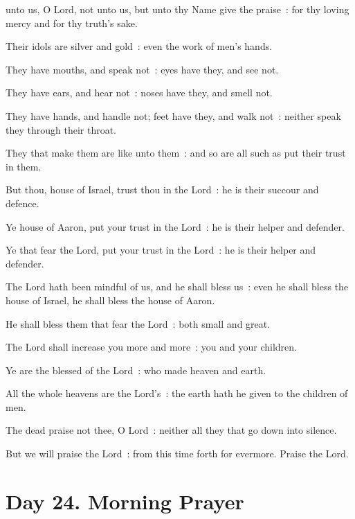  unto us, O Lord, not unto us, but unto thy Name give the praise~: for thy loving mercy and for thy truth's sake.\par
{}
Their idols are silver and gold~: even the work of men's hands.\par
{}They have mouths, and speak not~: eyes have they, and see not.\par
{}They have ears, and hear not~: noses have they, and smell not.\par
{}They have hands, and handle not; feet have they, and walk not~: neither speak they through their throat.\par
{}They that make them are like unto them~: and so are all such as put their trust in them.\par
{}But thou, house of Israel, trust thou in the Lord~: he is their succour and defence.\par
{}Ye house of Aaron, put your trust in the Lord~: he is their helper and defender.\par
{}Ye that fear the Lord, put your trust in the Lord~: he is their helper and defender.\par
{}The Lord hath been mindful of us, and he shall bless us~: even he shall bless the house of Israel, he shall bless the house of Aaron.\par
{}He shall bless them that fear the Lord~: both small and great.\par
{}The Lord shall increase you more and more~: you and your children.\par
{}Ye are the blessed of the Lord~: who made heaven and earth.\par
{}All the whole heavens are the Lord's~: the earth hath he given to the children of men.\par
{}The dead praise not thee, O Lord~: neither all they that go down into silence.\par
{}But we will praise the Lord~: from this time forth for evermore. Praise the Lord.\par



\clearpage
\section*{Day 24. Morning Prayer}

